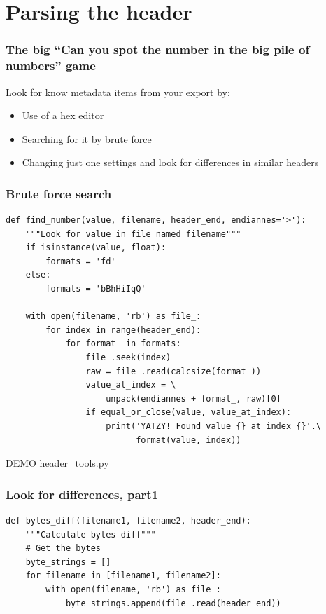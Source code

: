 \documentclass{beamer}
\begin{document}
\section{Parsing the header}
\begin{frame}
  \frametitle{The big ``Can you spot the number in the big pile of numbers'' game}
  \LARGE
  \begin{block}{Look for know metadata items from your export by:}
  \begin{itemize}
  \item Use of a hex editor
  \item Searching for it by brute force
  \item Changing just one settings and look for differences in similar headers
  \end{itemize}    
  \end{block}
\end{frame}

\begin{frame}[fragile]
  \frametitle{Brute force search}
  \small
  \begin{verbatim}
def find_number(value, filename, header_end, endiannes='>'):
    """Look for value in file named filename"""
    if isinstance(value, float):
        formats = 'fd'
    else:
        formats = 'bBhHiIqQ'

    with open(filename, 'rb') as file_:
        for index in range(header_end):
            for format_ in formats:
                file_.seek(index)
                raw = file_.read(calcsize(format_))
                value_at_index = \
                    unpack(endiannes + format_, raw)[0]
                if equal_or_close(value, value_at_index):
                    print('YATZY! Found value {} at index {}'.\
                          format(value, index))
  \end{verbatim}
  \LARGE DEMO header\_tools.py
\end{frame}


\begin{frame}[fragile]
  \frametitle{Look for differences, part1}
  \small
  \begin{verbatim}
def bytes_diff(filename1, filename2, header_end):
    """Calculate bytes diff"""
    # Get the bytes
    byte_strings = []
    for filename in [filename1, filename2]:
        with open(filename, 'rb') as file_:
            byte_strings.append(file_.read(header_end))
  \end{verbatim}
\end{frame}
\end{document}

